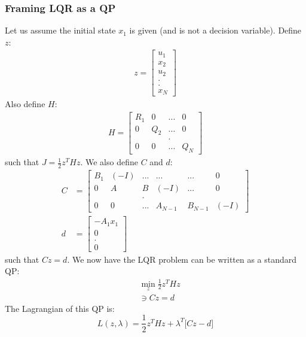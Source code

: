 \subsubsection{Framing LQR as a QP}
Let us assume the initial state $x_1$ is given (and is not a decision variable). Define $z$: 
\begin{align}
    z = \begin{bmatrix}
       u_1 \\
       x_2 \\
       u_2 \\
       . \\
       . \\
       x_N
    \end{bmatrix}
\end{align}
Also define $H$:
\begin{align}
    H = \begin{bmatrix}
        R_1 & 0   & ... & 0 \\
        0   & Q_2 & ... & 0 \\
        \   & \   & .   & \ \\
        0   & 0   & ... & Q_N
    \end{bmatrix}
\end{align}
such that $J = \frac{1}{2} z^T H z$. We also define $C$ and $d$: 
\begin{align}
    C &= \begin{bmatrix}
        B_1 & (-I)  & ...   & ...   & ...   & 0 \\
        0   & A     & B     & (-I)  & ...   & 0 \\
        \   & \     & .     & \ \\
        0   & 0     & ...   & A_{N-1} & B_{N-1} & (-I)
    \end{bmatrix} \\ 
    d &= \begin{bmatrix}
        -A_1 x_1 \\
        0 \\
        . \\ 
        0 
    \end{bmatrix}
\end{align}
such that $C z = d$. We now have the LQR problem can be written as a standard QP:
\begin{align}
    &\min_{z} \frac{1}{2} z^T H z \\
    \ &\ni C z = d
\end{align}
The Lagrangian of this QP is: 
\begin{equation}
    L(z, \lambda) = \frac{1}{2} z^T H z + \lambda^T \big[ C z - d\big]
\end{equation}
